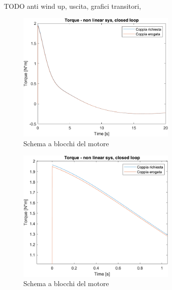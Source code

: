 TODO anti wind up, uscita, grafici transitori, 
\begin{figure}[H]
	\centering   	
	\includegraphics[width=0.7\textwidth]{Immagini/motore.png}
	\caption{Schema a blocchi del motore}
	\label{fig:motor}
\end{figure}
\begin{figure}[H]
	\centering   	
	\includegraphics[width=0.7\textwidth]{Immagini/motore_zoom.png}
	\caption{Schema a blocchi del motore}
	\label{fig:motor}
\end{figure}